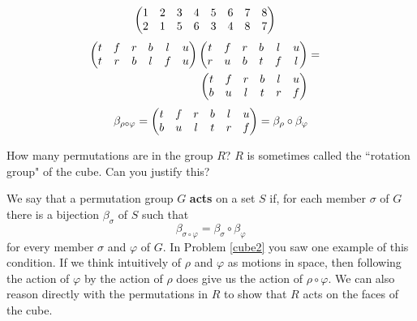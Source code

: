\begin{enumerate}
{\begin{eqnarray*}
\begin{pmatrix}1&2&3&4&5&6&7&8\cr 2&1&5&6&3&4&8&7\end{pmatrix}&&
\end{eqnarray*}
\begin{eqnarray*}
\begin{pmatrix}t&f&r&b&l&u\cr t&r&b&l&f&u\end{pmatrix}\begin{pmatrix}t&f&r&b&l&u\cr r&u&b&t&f&l\end{pmatrix}&=&\\
\begin{pmatrix}t&f&r&b&l&u\cr b&u&l&t&r&f\end{pmatrix}&&
\end{eqnarray*}
$$\beta_{\rho\circ\varphi} =\begin{pmatrix}t&f&r&b&l&u\cr
b&u&l&t&r&f\end{pmatrix}=\beta_{\rho}\circ\beta_{\varphi}$$ }
\end{enumerate}

\itemei How many permutations are in the group $R$?  $R$ is sometimes
called the ``rotation group" of the cube.  Can you justify this?
\ep

We say that a permutation group $G$ {\bf acts} on a set
$S$ if, for each member
$\sigma$ of $G$ there is a bijection $\beta_{\sigma}$ of $S$ such
that
$$\beta_{\sigma\circ\varphi} = \beta_{\sigma}\circ\beta_{\varphi}$$ for
every member $\sigma$ and $\varphi$ of $G$. In Problem \ref{cube2} you
saw one example of this condition.  If we think intuitively of $\rho$ and
$\varphi$ as motions in space, then following the action of $\varphi$ by
the action of $\rho$ does give us the action of $\rho\circ\varphi$.  We
can also reason directly with the permutations in $R$ to show that $R$
acts on the faces of the cube.  

